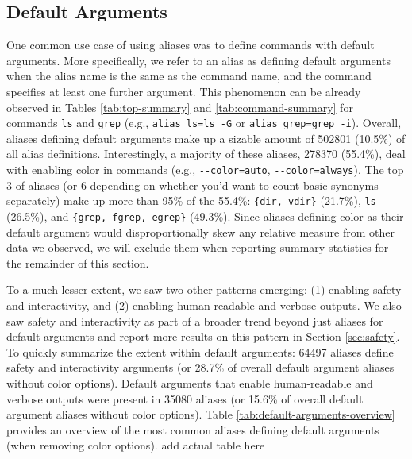 \subsection{Default Arguments}

One common use case of using aliases was to define commands with default arguments.
More specifically, we refer to an alias as defining default arguments when the alias name is the same as the command name, and the command specifies at least one further argument.
This phenomenon can be already observed in Tables \ref{tab:top-summary} and \ref{tab:command-summary} for commands \verb|ls| and \verb|grep| (e.g., \verb|alias ls=ls -G| or \verb|alias grep=grep -i|).
Overall, aliases defining default arguments make up a sizable amount of 502801 (10.5\%) of all alias definitions. 
Interestingly, a majority of these aliases, 278370 (55.4\%), deal with enabling color in commands (e.g., \verb|--color=auto|, \verb|--color=always|).
The top 3 of aliases (or 6 depending on whether you'd want to count basic synonyms separately) make up more than 95\% of the 55.4\%: \verb|{dir, vdir}| (21.7\%), \verb|ls| (26.5\%), and \verb|{grep, fgrep, egrep}| (49.3\%).
Since aliases defining color as their default argument would disproportionally skew any relative measure from other data we observed, we will exclude them when reporting summary statistics for the remainder of this section.

To a much lesser extent, we saw two other patterns emerging: (1) enabling safety and interactivity, and (2) enabling human-readable and verbose outputs.
We also saw safety and interactivity as part of a broader trend beyond just aliases for default arguments and report more results on this pattern in Section \ref{sec:safety}.
To quickly summarize the extent within default arguments: 64497 aliases define safety and interactivity arguments (or 28.7\% of overall default argument aliases without color options).
Default arguments that enable human-readable and verbose outputs were present in 35080 aliases (or 15.6\% of overall default argument aliases without color options).
Table \ref{tab:default-arguments-overview} provides an overview of the most common aliases defining default arguments (when removing color options).
\TODO add actual table here

